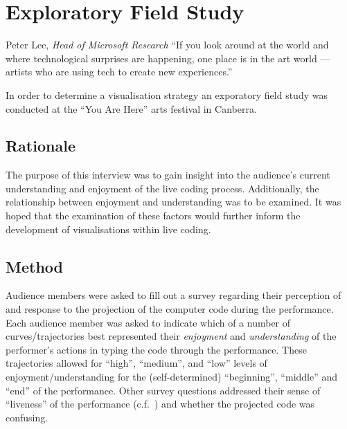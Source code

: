 
\chapter{Exploratory Field Study}
\label{chap:exploratory-field-study}

\begin{chapquote}{Peter Lee, \textit{Head of Microsoft Research}}
``If you look around at the world and where technological surprises are happening, one place is in the art world — artists who are using tech to create new experiences.''
\end{chapquote}


In order to determine a visualisation strategy an exporatory field study was conducted at the ``You Are Here'' arts festival in Canberra.

\section{Rationale}

The purpose of this interview was to gain insight into the audience’s current understanding and enjoyment of the live coding process. Additionally, the relationship between enjoyment and understanding was to be examined. It was hoped that the examination of these factors would further inform the development of visualisations within live coding.

\section{Method}

Audience members were asked to fill out a survey regarding their perception of and response to the projection of the computer code during the
performance. Each audience member was asked to indicate which of a
number of curves/trajectories best represented their \emph{enjoyment}
and \emph{understanding} of the performer's actions in typing the code
through the performance. These trajectories allowed for ``high'',
``medium'', and ``low'' levels of enjoyment/understanding for the
(self-determined) ``beginning'', ``middle'' and ``end'' of the
performance. Other survey questions addressed their sense of
``liveness'' of the performance (c.f.~\cite{Auslander}) and whether
the projected code was confusing.


